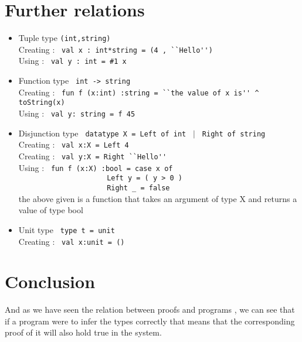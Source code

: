 \section{Further relations}
\begin{itemize}
    \item Tuple type \verb|(int,string)|\\
      Creating : \verb| val x : int*string = (4 , ``Hello'')|\\
      Using : \verb| val y : int = #1 x|\\
    \item Function type \verb| int -> string |\\
      Creating : \verb| fun f (x:int) :string = ``the value of x is'' ^ toString(x) |\\
      Using : \verb| val y: string = f 45|\\
    
    \item Disjunction type \verb| datatype X = Left of int | $|$  \verb| Right of string |\\
      Creating : \verb| val x:X = Left 4|\\
      Creating : \verb| val y:X = Right ``Hello'' |\\
      Using : \verb| fun f (x:X) :bool = case x of |\\
            \verb|                     Left y = ( y > 0 )|\\
              \verb|                     Right _ = false|\\
      the above given is a function that takes an argument of type X and returns a value of type bool\\
              
    \item Unit type \verb| type t = unit |\\
      Creating : \verb| val x:unit = () |\\
              
    \end{itemize}

\section{Conclusion}

    And as we have seen the relation between proofs and programs , we can see that if a program were to infer
the types correctly that means that the corresponding proof of it will also hold true in the system.